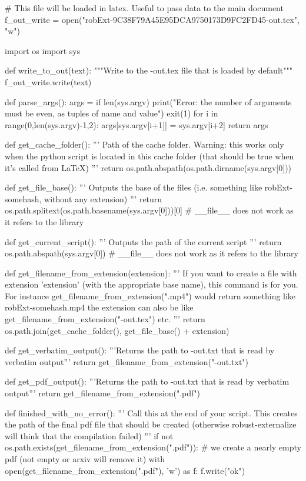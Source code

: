 
# This file will be loaded in latex. Useful to pass data to the main document
f_out_write = open("robExt-9C38F79A45E95DCA9750173D9FC2FD45-out.tex", "w")

import os
import sys

def write_to_out(text):
    """Write to the -out.tex file that is loaded by default"""
    f_out_write.write(text)

def parse_args():
    args = {}
    if len(sys.argv) %
        print("Error: the number of arguments must be even, as tuples of name and value")
        exit(1)
    for i in range(0,len(sys.argv)-1,2):
        args[sys.argv[i+1]] = sys.argv[i+2]
    return args

def get_cache_folder():
    '''
    Path of the cache folder. Warning: this works only when the python script
    is located in this cache folder (that should be true when it's called from LaTeX)
    '''
    return os.path.abspath(os.path.dirname(sys.argv[0]))

def get_file_base():
    '''
    Outputs the base of the files (i.e. something like robExt-somehash, without any extension)
    '''
    return os.path.splitext(os.path.basename(sys.argv[0]))[0] # __file__ does not work as it refers to the library

def get_current_script():
    '''
    Outputs the path of the current script
    '''
    return os.path.abspath(sys.argv[0]) # __file__ does not work as it refers to the library


def get_filename_from_extension(extension):
    '''
    If you want to create a file with extension 'extension' (with the appropriate base name), this command
    is for you. For instance get_filename_from_extension(".mp4") would return something like
    robExt-somehash.mp4
    the extension can also be like get_filename_from_extension("-out.tex") etc.
    '''
    return os.path.join(get_cache_folder(), get_file_base() + extension)

def get_verbatim_output():
    '''Returns the path to -out.txt that is read by verbatim output'''
    return get_filename_from_extension("-out.txt")

def get_pdf_output():
    '''Returns the path to -out.txt that is read by verbatim output'''
    return get_filename_from_extension(".pdf")


def finished_with_no_error():
    '''
    Call this at the end of your script. This creates the path of the final pdf file that should be
    created (otherwise robust-externalize will think that the compilation failed)
    '''
    if not os.path.exists(get_filename_from_extension(".pdf")):
        # we create a nearly empty pdf (not empty or arxiv will remove it)
        with open(get_filename_from_extension(".pdf"), 'w') as f:
            f.write("ok")

